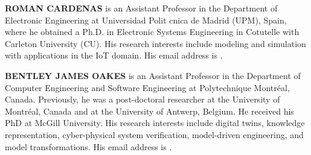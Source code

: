 \documentclass{article}
\begin{document}
\textbf{\uppercase{Roman Cardenas}} is an Assistant Professor in the Department of Electronic Engineering at Universidad Polit cnica de Madrid (UPM), Spain, where he obtained a Ph.D. in Electronic Systems Engineering
in Cotutelle with Carleton University (CU). His research interests include modeling and simulation with
applications in the IoT domain. His email address is .

\textbf{\uppercase{Bentley James Oakes}} is an Assistant Professor in the Department of Computer Engineering and Software Engineering at Polytechnique Montr\'{e}al, Canada. Previously, he was a post-doctoral researcher at the University of Montr\'{e}al, Canada and at the University of Antwerp, Belgium. He received his PhD at McGill University. His research interests include digital twins, knowledge representation, cyber-physical system verification, model-driven engineering, and model transformations. His email address is .
\end{document}
